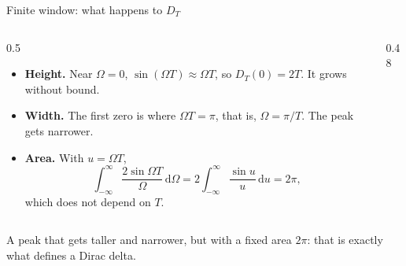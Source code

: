 \documentclass[11pt,aspectratio=169]{beamer}
\newcommand{\dd}{\,\mathrm{d}}
\begin{document}
\begin{frame}{Finite window: what happens to $D_T$}
  \begin{columns}[c]
    \begin{column}{0.5\textwidth}
      \begin{itemize}
        \item \textbf{Height.} Near $\Omega=0$, $\sin(\Omega T)\approx\Omega T$, so
              $D_T(0)=2T$. It grows without bound.
        \medskip
        \item \textbf{Width.} The first zero is where $\Omega T=\pi$, that is, $\Omega=\pi/T$.
              The peak gets narrower.
        \medskip
        \item \textbf{Area.} With $u=\Omega T$,
              \[
                \int_{-\infty}^{\infty}\frac{2\sin\Omega T}{\Omega}\dd\Omega
                =2\int_{-\infty}^{\infty}\frac{\sin u}{u}\dd u=2\pi,
              \]
              which does not depend on $T$.
      \end{itemize}
    \end{column}
    \begin{column}{0.48\textwidth}
    \end{column}
  \end{columns}
  \vspace{2mm}
  A peak that gets taller and narrower, but with a fixed area $2\pi$: that is exactly what
  defines a Dirac delta.
\end{frame}
\end{document}
